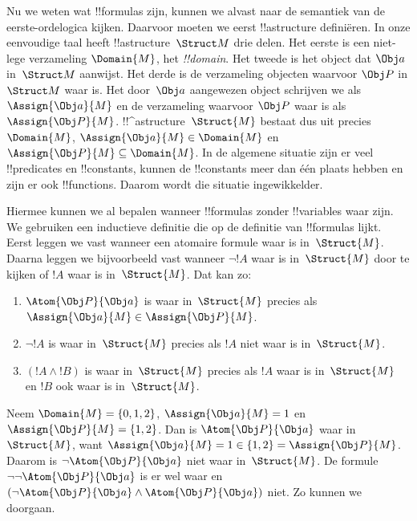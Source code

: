 \documentclass[../../../include/open-logic-section]{subfiles}
\begin{document}


Nu we weten wat !!{formula}s zijn, kunnen we alvast naar de semantiek
van de eerste-ordelogica kijken. Daarvoor moeten we eerst !!a{structure}
definiëren. In onze eenvoudige taal heeft !!a{structure}~$\Struct M$
drie delen. Het eerste is een niet-lege verzameling $\Domain{M}$, het
\emph{!!{domain}}. Het tweede is het object dat $\Obj a$ in~$\Struct M$
aanwijst. Het derde is de verzameling objecten waarvoor $\Obj P$ in
$\Struct M$ waar is. Het door~$\Obj a$ aangewezen object schrijven we
als $\Assign{\Obj a}{M}$ en de verzameling waarvoor $\Obj P$ waar is
als $\Assign{\Obj P}{M}$. !!^a{structure}~$\Struct{M}$ bestaat dus uit
precies $\Domain{M}$, $\Assign{\Obj a}{M} \in \Domain{M}$ en
$\Assign{\Obj P}{M} \subseteq \Domain{M}$. In de algemene situatie
zijn er veel !!{predicate}s en !!{constant}s, kunnen de !!{constant}s
meer dan één plaats hebben en zijn er ook !!{function}s. Daarom wordt
die situatie ingewikkelder.

Hiermee kunnen we al bepalen wanneer !!{formula}s zonder
!!{variable}s waar zijn. We gebruiken een inductieve definitie die op
de definitie van !!{formula}s lijkt. Eerst leggen we vast wanneer een
atomaire formule waar is in~$\Struct{M}$. Daarna leggen we bijvoorbeeld
vast wanneer $\lnot !A$ waar is in~$\Struct{M}$ door te kijken of $!A$
waar is in~$\Struct{M}$. Dat kan zo:
\begin{enumerate}
  \item $\Atom{\Obj P}{\Obj a}$ is waar in~$\Struct{M}$ precies als
  $\Assign{\Obj a}{M} \in \Assign{\Obj P}{M}$.
  \item $\lnot !A$ is waar in~$\Struct{M}$ precies als $!A$ niet waar
  is in~$\Struct{M}$.
  \item $(!A \land !B)$ is waar in~$\Struct{M}$ precies als $!A$ waar
  is in~$\Struct{M}$ en $!B$ ook waar is in~$\Struct{M}$.
\end{enumerate}
Neem $\Domain{M} = \{0, 1, 2\}$, $\Assign{\Obj a}{M} = 1$ en
$\Assign{\Obj P}{M} = \{1, 2\}$. Dan is
$\Atom{\Obj P}{\Obj a}$ waar in~$\Struct{M}$, want
$\Assign{\Obj a}{M} =  1 \in \{1,2\} = \Assign{\Obj P}{M}$. Daarom is
$\lnot \Atom{\Obj P}{\Obj a}$ niet waar in~$\Struct{M}$. De formule
$\lnot\lnot \Atom{\Obj P}{\Obj a}$ is er wel waar en
$(\lnot \Atom{\Obj P}{\Obj a} \land \Atom{\Obj P}{\Obj a})$ niet.
Zo kunnen we doorgaan.
\end{document}
